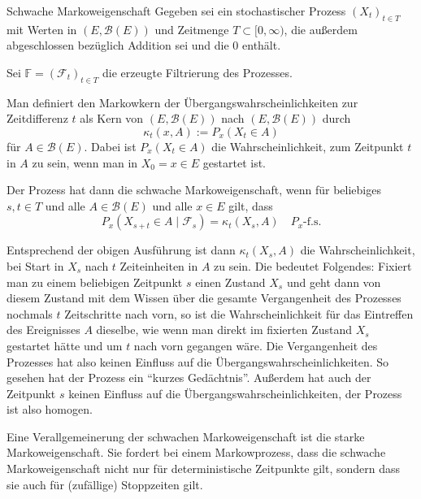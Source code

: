 \begin{defi}{Schwache Markoweigenschaft}
    Gegeben sei ein stochastischer Prozess $(X_{t})_{t\in T}$ mit Werten in $(E,{\mathcal{B}}(E))$ und Zeitmenge $T\subset [0,\infty )$, die außerdem abgeschlossen bezüglich Addition sei und die 0 enthält.

    Sei $\mathbb{F} = ({\mathcal{F}}_{t})_{t\in T}$ die erzeugte Filtrierung des Prozesses.

    Man definiert den Markowkern der Übergangswahrscheinlichkeiten zur Zeitdifferenz $t$ als Kern von $(E,{\mathcal{B}}(E))$ nach $(E,{\mathcal{B}}(E))$ durch
    \[
        \kappa_t(x, A) := P_x(X_t \in A)
    \]
    für $A \in{\mathcal{B}}(E)$.
    Dabei ist $P_x(X_t \in A)$ die Wahrscheinlichkeit, zum Zeitpunkt $t$ in $A$ zu sein, wenn man in $X_0 = x \in E$ gestartet ist.

    Der Prozess hat dann die schwache Markoweigenschaft, wenn für beliebiges $s, t \in T$ und alle $A \in{\mathcal{B}}(E)$ und alle $x \in E$ gilt, dass
    \[
        P_x(X_{s+t} \in A \mid{\mathcal{F}}_s) = \kappa_t(X_s, A) \quad P_x\text{-f.s.}
    \]

    Entsprechend der obigen Ausführung ist dann $\kappa_{t}(X_{s},A)$ die Wahrscheinlichkeit, bei Start in $X_{s}$ nach $t$ Zeiteinheiten in $A$ zu sein.
    Die bedeutet Folgendes:
    Fixiert man zu einem beliebigen Zeitpunkt $s$ einen Zustand $X_{s}$ und geht dann von diesem Zustand mit dem Wissen über die gesamte Vergangenheit des Prozesses nochmals $t$ Zeitschritte nach vorn, so ist die Wahrscheinlichkeit für das Eintreffen des Ereignisses $A$ dieselbe, wie wenn man direkt im fixierten Zustand $X_{s}$ gestartet hätte und um $t$ nach vorn gegangen wäre.
    Die Vergangenheit des Prozesses hat also keinen Einfluss auf die Übergangswahrscheinlichkeiten.
    So gesehen hat der Prozess ein \enquote{kurzes Gedächtnis}.
    Außerdem hat auch der Zeitpunkt $s$ keinen Einfluss auf die Übergangswahrscheinlichkeiten, der Prozess ist also homogen.

    Eine Verallgemeinerung der schwachen Markoweigenschaft ist die starke Markoweigenschaft. Sie fordert bei einem Markowprozess, dass die schwache Markoweigenschaft nicht nur für deterministische Zeitpunkte gilt, sondern dass sie auch für (zufällige) Stoppzeiten gilt.
\end{defi}

